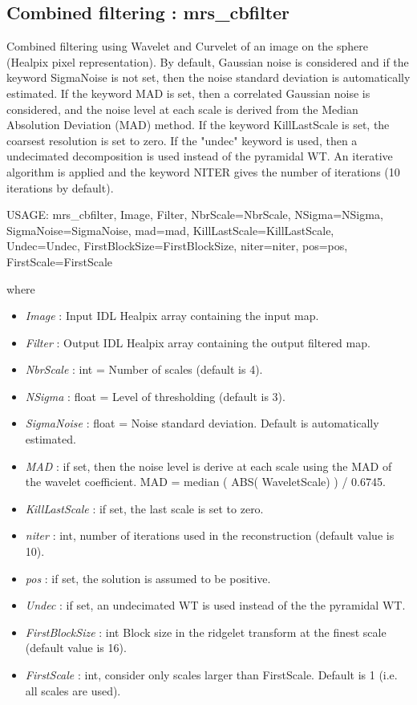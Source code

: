 \subsection{Combined filtering : mrs\_cbfilter}
Combined filtering using Wavelet and Curvelet of an image on the sphere (Healpix pixel representation). By default, Gaussian noise 
is considered and if the keyword SigmaNoise is not set, then the noise standard deviation is automatically estimated. If the keyword 
MAD is set, then a correlated Gaussian noise is considered, and the noise level at each scale is derived from the Median Absolution 
Deviation (MAD) method. If the keyword KillLastScale is set, the coarsest resolution is set to zero. If the "undec" keyword is used, 
then a undecimated decomposition is used instead of the pyramidal WT. An iterative algorithm is applied and the keyword NITER gives 
the number of iterations (10 iterations by default).

{\bf
\begin{center}
     USAGE:  mrs\_cbfilter, Image, Filter, NbrScale=NbrScale, NSigma=NSigma, SigmaNoise=SigmaNoise, mad=mad, KillLastScale=KillLastScale, 
     						Undec=Undec, FirstBlockSize=FirstBlockSize, niter=niter, pos=pos, FirstScale=FirstScale     
\end{center}}
where
\begin{itemize}
\item {\em Image} : Input IDL Healpix array containing the input map.
\item {\em Filter} : Output IDL Healpix array containing the output filtered map.
\item {\em NbrScale} : int = Number of scales (default is 4).
\item {\em NSigma} : float = Level of thresholding (default is 3).
\item {\em SigmaNoise} : float = Noise standard deviation. Default is automatically estimated.
\item {\em MAD} : if set, then the noise level is derive at each scale using the MAD of the   
wavelet coefficient. MAD = median ( ABS( WaveletScale) ) / 0.6745.
\item {\em KillLastScale} : if set, the last scale is set to zero.
\item {\em niter} : int, number of iterations used in the reconstruction (default value is 10).
\item {\em pos} : if set, the solution is assumed to be positive.
\item {\em Undec} : if set, an undecimated WT is used instead of the the pyramidal WT.
\item {\em FirstBlockSize} : int Block size in the ridgelet transform at the finest scale (default value is 16).
\item {\em FirstScale} : int, consider only scales larger than FirstScale. Default is 1 (i.e. all scales are used).
\end{itemize}

